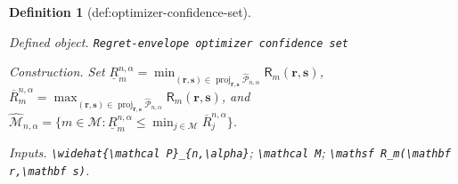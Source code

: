 \documentclass{article}
\newtheorem{definition}{Definition}
\begin{document}
\begin{definition}[def:optimizer-confidence-set]\label{def:optimizer-confidence-set}
\par\smallskip\noindent\emph{Defined object.} \texttt{Regret-\allowbreak{}envelope optimizer confidence set}
\par\smallskip\noindent\emph{Construction.} Set \(\underline R_m^{n,\alpha}=\min_{(\mathbf r,\mathbf s)\in\operatorname{proj}_{\mathbf r,\mathbf s}\widehat{\mathcal P}_{n,\alpha}}\mathsf R_m(\mathbf r,\mathbf s)\), \(\overline R_m^{n,\alpha}=\max_{(\mathbf r,\mathbf s)\in\operatorname{proj}_{\mathbf r,\mathbf s}\widehat{\mathcal P}_{n,\alpha}}\mathsf R_m(\mathbf r,\mathbf s)\), and \(\widehat{\mathcal M}_{n,\alpha}=\{m\in\mathcal M:\underline R_m^{n,\alpha}\le\min_{j\in\mathcal M}\overline R_j^{n,\alpha}\}\).
\par\smallskip\noindent\emph{Inputs.} \texttt{\textbackslash{}\allowbreak{}widehat\{\textbackslash{}\allowbreak{}mathcal P\}\allowbreak{}\_\allowbreak{}\{n,\allowbreak{}\textbackslash{}\allowbreak{}alpha\}\allowbreak{}}; \texttt{\textbackslash{}\allowbreak{}mathcal M}; \texttt{\textbackslash{}\allowbreak{}mathsf R\_\allowbreak{}m(\textbackslash{}\allowbreak{}mathbf r,\allowbreak{}\textbackslash{}\allowbreak{}mathbf s)}.
\end{definition}
\end{document}
